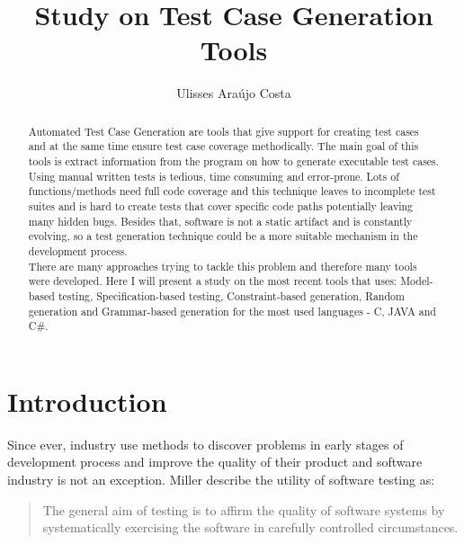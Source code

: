 \documentclass[citeauthoryear]{llncs}
\title{Study on Test Case Generation Tools}
\author{Ulisses Araújo Costa}
\institute{Department of Informatics, University of Minho\\ Campus de Gualtar, 4710-057 Braga, Portugal\\
\email{ulissesmonhecosta@gmail.com}
}
\begin{document}
\maketitle
\begin{abstract}
Automated Test Case Generation are tools that give support for creating test cases and at the same time ensure test case coverage methodically.
The main goal of this tools is extract information from the program on how to generate executable test cases.\\
Using  manual written tests is tedious, time consuming and error-prone. Lots of functions/methods need full code coverage and this technique leaves
to incomplete test suites and is hard to create tests that cover specific code paths potentially leaving many hidden bugs.
Besides that, software is not a static artifact and is constantly evolving, so a test generation technique could be a more suitable mechanism in the development process.\\
There are many approaches trying to tackle this problem and therefore many tools were developed. Here I will present a study on the most recent tools that uses:
Model-based testing, Specification-based testing, Constraint-based generation, Random generation and Grammar-based generation for the most used languages - C, JAVA and C\#.
\end{abstract}

\section{Introduction}
Since ever, industry use methods to discover problems in early stages of development process and improve
the quality of their product and software industry is not an exception. Miller\cite{miller} describe the utility
of software testing as:

\begin{quotation}
The general aim of testing is to affirm the quality of software systems by systematically
exercising the software in carefully controlled circumstances.
\end{quotation}
\end{document}
